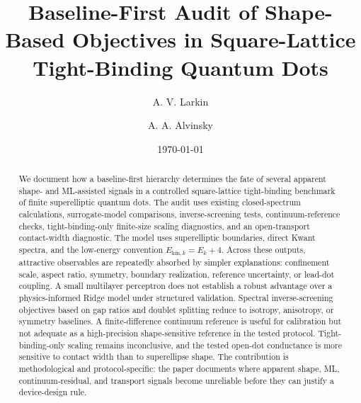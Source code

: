 \documentclass[
reprint,
aps,
prb,
amsmath,
amssymb,
superscriptaddress,
longbibliography
]{revtex4-2}
\begin{document}
\title{
Baseline-First Audit of Shape-Based Objectives in Square-Lattice
Tight-Binding Quantum Dots
}

\author{A. V. Larkin}

\author{A. A. Alvinsky}

\date{\today}

\begin{abstract}
We document how a baseline-first hierarchy determines the fate of several
apparent shape- and ML-assisted signals in a controlled square-lattice
tight-binding benchmark of finite superelliptic quantum dots. The audit uses
existing closed-spectrum
calculations, surrogate-model comparisons, inverse-screening tests,
continuum-reference checks, tight-binding-only finite-size scaling diagnostics,
and an open-transport contact-width diagnostic. The model uses superelliptic
boundaries, direct Kwant spectra, and the low-energy convention
$E_{\mathrm{kin},k}=E_k+4$. Across these outputs, attractive observables are
repeatedly absorbed by simpler explanations: confinement scale, aspect ratio,
symmetry, boundary realization, reference uncertainty, or lead-dot coupling. A
small multilayer perceptron does not establish a robust advantage over a
physics-informed Ridge model under structured validation. Spectral
inverse-screening objectives based on gap ratios and doublet splitting reduce
to isotropy, anisotropy, or symmetry baselines. A finite-difference continuum
reference is useful for calibration but not adequate as a high-precision
shape-sensitive reference in the tested protocol. Tight-binding-only scaling
remains inconclusive, and the tested open-dot conductance is more sensitive to
contact width than to superellipse shape. The contribution is methodological
and protocol-specific: the paper documents where apparent shape, ML,
continuum-residual, and transport signals become unreliable before they can
justify a device-design rule.
\end{abstract}

\maketitle







\clearpage


\end{document}

